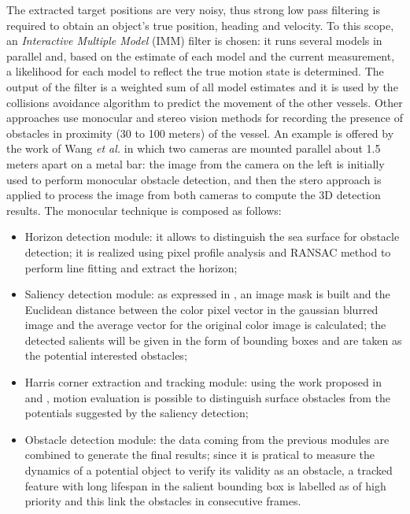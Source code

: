 \documentclass[journal]{IEEEtran}
\begin{document}
The extracted target positions are very noisy, thus strong low pass filtering is required to obtain an object's true position, heading and velocity. To this scope, an \textit{Interactive Multiple Model} (IMM) filter is chosen: it runs several models in parallel and, based on the estimate of each model and the current measurement, a likelihood for each model to reflect the true motion state is determined. The output of the filter is a weighted sum of all model estimates and it is used by the collisions avoidance algorithm to predict the movement of the other vessels.
\indent Other approaches use monocular and stereo vision methods for recording the presence of obstacles in proximity (30 to 100 meters) of the vessel. An example is offered by the work of Wang \textit{et al.} \cite{Wang2011,Wang2012} in which two cameras are mounted parallel about 1.5 meters apart on a metal bar: the image from the camera on the left is initially used to perform monocular obstacle detection, and then the stero approach is applied to process the image from both cameras to compute the 3D detection results. The monocular technique is composed as follows:
\begin{itemize}
\item Horizon detection module: it allows to distinguish the sea surface for obstacle detection; it is realized using pixel profile analysis and RANSAC method to perform line fitting and extract the horizon;
\item Saliency detection module: as expressed in \cite{Achanta2009}, an image mask is built and the Euclidean distance between the color pixel vector in the gaussian blurred image and the average vector for the original color image is calculated; the detected salients will be given in the form of bounding boxes and are taken as the potential interested obstacles;
\item Harris corner extraction and tracking module: using the work proposed in \cite{Harris1988} and \cite{Bouguet1999}, motion evaluation is possible to distinguish surface obstacles from the potentials suggested by the saliency detection;
\item Obstacle detection module: the data coming from the previous modules are combined to generate the final results; since it is pratical to measure the dynamics of a potential object to verify its validity as an obstacle, a tracked feature with long lifespan in the salient bounding box is labelled as of high priority and this link the obstacles in consecutive frames.
\end{itemize}
\end{document}
